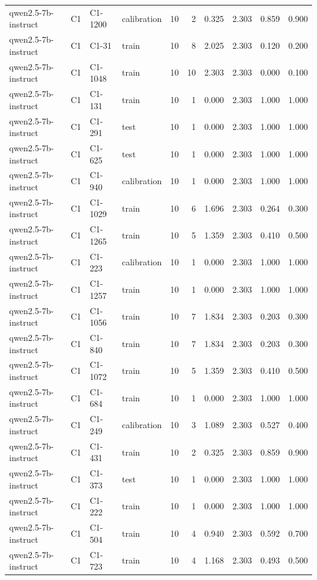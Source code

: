 \begin{table}
\begin{tabular}{llllrrrrrr}
qwen2.5-7b-instruct & C1 & C1-1200 & calibration & 10 & 2 & 0.325 & 2.303 & 0.859 & 0.900 \\
qwen2.5-7b-instruct & C1 & C1-31 & train & 10 & 8 & 2.025 & 2.303 & 0.120 & 0.200 \\
qwen2.5-7b-instruct & C1 & C1-1048 & train & 10 & 10 & 2.303 & 2.303 & 0.000 & 0.100 \\
qwen2.5-7b-instruct & C1 & C1-131 & train & 10 & 1 & 0.000 & 2.303 & 1.000 & 1.000 \\
qwen2.5-7b-instruct & C1 & C1-291 & test & 10 & 1 & 0.000 & 2.303 & 1.000 & 1.000 \\
qwen2.5-7b-instruct & C1 & C1-625 & test & 10 & 1 & 0.000 & 2.303 & 1.000 & 1.000 \\
qwen2.5-7b-instruct & C1 & C1-940 & calibration & 10 & 1 & 0.000 & 2.303 & 1.000 & 1.000 \\
qwen2.5-7b-instruct & C1 & C1-1029 & train & 10 & 6 & 1.696 & 2.303 & 0.264 & 0.300 \\
qwen2.5-7b-instruct & C1 & C1-1265 & train & 10 & 5 & 1.359 & 2.303 & 0.410 & 0.500 \\
qwen2.5-7b-instruct & C1 & C1-223 & calibration & 10 & 1 & 0.000 & 2.303 & 1.000 & 1.000 \\
qwen2.5-7b-instruct & C1 & C1-1257 & train & 10 & 1 & 0.000 & 2.303 & 1.000 & 1.000 \\
qwen2.5-7b-instruct & C1 & C1-1056 & train & 10 & 7 & 1.834 & 2.303 & 0.203 & 0.300 \\
qwen2.5-7b-instruct & C1 & C1-840 & train & 10 & 7 & 1.834 & 2.303 & 0.203 & 0.300 \\
qwen2.5-7b-instruct & C1 & C1-1072 & train & 10 & 5 & 1.359 & 2.303 & 0.410 & 0.500 \\
qwen2.5-7b-instruct & C1 & C1-684 & train & 10 & 1 & 0.000 & 2.303 & 1.000 & 1.000 \\
qwen2.5-7b-instruct & C1 & C1-249 & calibration & 10 & 3 & 1.089 & 2.303 & 0.527 & 0.400 \\
qwen2.5-7b-instruct & C1 & C1-431 & train & 10 & 2 & 0.325 & 2.303 & 0.859 & 0.900 \\
qwen2.5-7b-instruct & C1 & C1-373 & test & 10 & 1 & 0.000 & 2.303 & 1.000 & 1.000 \\
qwen2.5-7b-instruct & C1 & C1-222 & train & 10 & 1 & 0.000 & 2.303 & 1.000 & 1.000 \\
qwen2.5-7b-instruct & C1 & C1-504 & train & 10 & 4 & 0.940 & 2.303 & 0.592 & 0.700 \\
qwen2.5-7b-instruct & C1 & C1-723 & train & 10 & 4 & 1.168 & 2.303 & 0.493 & 0.500 \\

\end{tabular}
\end{table}
